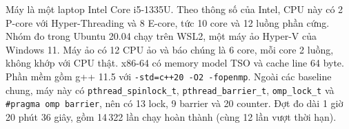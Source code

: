 Máy  là một laptop Intel Core i5-1335U. Theo thông số của Intel, CPU này có 2 P-core với
Hyper-Threading và 8 E-core, tức 10 core và 12 luồng phần cứng. Nhóm đo trong Ubuntu 20.04 chạy trên
WSL2, một máy ảo Hyper-V của Windows 11. Máy ảo có 12 CPU ảo và báo chúng là 6 core, mỗi core 2 luồng,
không khớp với CPU thật. x86-64 có memory model TSO và cache line 64 byte. Phần mềm gồm g++ 11.5 với
\texttt{-std=c++20 -O2 -fopenmp}. Ngoài các baseline chung, máy này có \texttt{pthread\_spinlock\_t},
\texttt{pthread\_barrier\_t}, \texttt{omp\_lock\_t} và \texttt{\#pragma omp barrier}, nên có 13 lock, 9
barrier và 20 counter. Đợt đo dài 1 giờ 20 phút 36 giây, gồm 14\,322 lần chạy hoàn thành (cùng 12 lần
vượt thời hạn).
